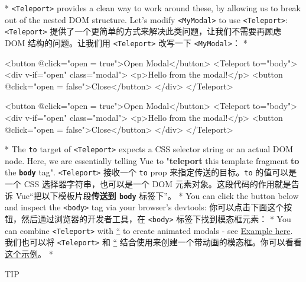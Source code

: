 \begin{paracol}{2}
\begin{itemize}
\end{itemize}
\switchcolumn[0]*%
\texttt{\textless{}Teleport\textgreater{}} provides a clean way to work
around these, by allowing us to break out of the nested DOM structure.
Let's modify \texttt{\textless{}MyModal\textgreater{}} to use
\texttt{\textless{}Teleport\textgreater{}}:
\switchcolumn
\texttt{\textless{}Teleport\textgreater{}}
提供了一个更简单的方式来解决此类问题，让我们不需要再顾虑 DOM
结构的问题。让我们用 \texttt{\textless{}Teleport\textgreater{}} 改写一下
\texttt{\textless{}MyModal\textgreater{}}：
\switchcolumn[0]*%
\begin{codeHtml}
<button @click="open = true">Open Modal</button>
<Teleport to="body">
  <div v-if="open" class="modal">
    <p>Hello from the modal!</p>
    <button @click="open = false">Close</button>
  </div>
</Teleport>
\end{codeHtml}
\switchcolumn
\begin{codeHtml}
<button @click="open = true">Open Modal</button>
<Teleport to="body">
  <div v-if="open" class="modal">
    <p>Hello from the modal!</p>
    <button @click="open = false">Close</button>
  </div>
</Teleport>
\end{codeHtml}
\switchcolumn[0]*%
The \texttt{to} target of \texttt{\textless{}Teleport\textgreater{}}
expects a CSS selector string or an actual DOM node. Here, we are
essentially telling Vue to "\textbf{teleport} this template fragment
\textbf{to} the \textbf{\texttt{body}} tag".
\switchcolumn
\texttt{\textless{}Teleport\textgreater{}} 接收一个 \texttt{to} prop
来指定传送的目标。\texttt{to} 的值可以是一个 CSS
选择器字符串，也可以是一个 DOM 元素对象。这段代码的作用就是告诉
Vue``把以下模板片段\textbf{传送到 \texttt{body}} 标签下''。
\switchcolumn[0]*%
You can click the button below and inspect the
\texttt{\textless{}body\textgreater{}} tag via your browser's devtools:
\switchcolumn
你可以点击下面这个按钮，然后通过浏览器的开发者工具，在
\texttt{\textless{}body\textgreater{}} 标签下找到模态框元素：
\switchcolumn[0]*%
You can combine \texttt{\textless{}Teleport\textgreater{}} with
\href{https://vuejs.org/guide/built-ins/transition.html}{``} to create
animated modals - see \href{https://vuejs.org/examples/\#modal}{Example
here}.
\switchcolumn
我们也可以将 \texttt{\textless{}Teleport\textgreater{}} 和
\href{https://cn.vuejs.org/guide/built-ins/transition.html}{``}
结合使用来创建一个带动画的模态框。你可以看看\href{https://cn.vuejs.org/examples/\#modal}{这个示例}。
\switchcolumn[0]*%
\begin{vueQuote}{TIP}

\end{vueQuote}
\end{paracol}
